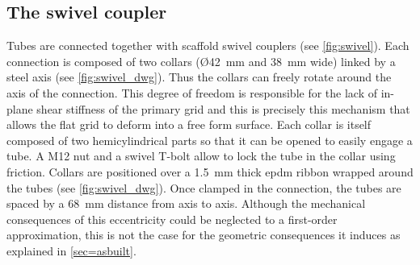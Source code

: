 \subsection{The swivel coupler}\label{sec=swivel}
Tubes are connected together with scaffold swivel couplers (see \cref{fig:swivel}). Each connection is composed of two collars (\O\;\SI{42}{\mm} and \SI{38}{\mm} wide) linked by a steel axis (see \cref{fig:swivel_dwg}). Thus the collars can freely rotate around the axis of the connection. This degree of freedom is responsible for the lack of in-plane shear stiffness of the primary grid and this is precisely this mechanism that allows the flat grid to deform into a free form surface. Each collar is itself composed of two hemicylindrical parts so that it can be opened to easily engage a tube. A M12 nut and a swivel T-bolt allow to lock the tube in the collar using friction. Collars are positioned over a \SI{1.5}{\mm} thick epdm ribbon wrapped around the tubes (see \cref{fig:swivel_dwg}). Once clamped in the connection, the tubes are spaced by a \SI{68}{\mm} distance from axis to axis. Although the mechanical consequences of this eccentricity could be neglected to a first-order approximation, this is not the case for the geometric consequences it induces as explained in \cref{sec=asbuilt}.


